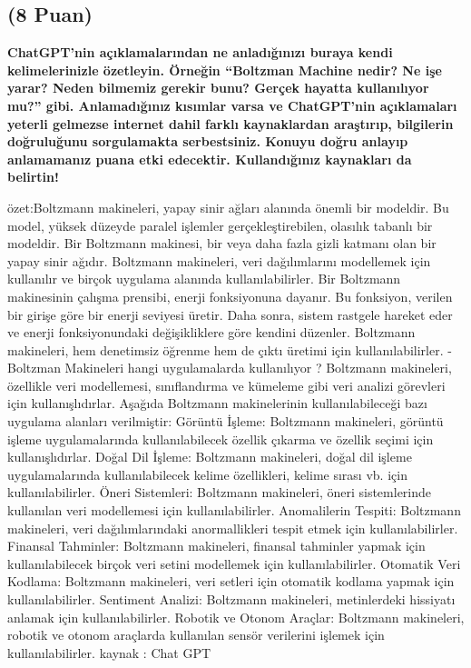 \documentclass[11pt]{article}
\begin{document}
\subsection{(8 Puan)} \textbf{ChatGPT’nin açıklamalarından ne anladığınızı buraya kendi kelimelerinizle özetleyin. Örneğin ``Boltzman Machine nedir? Ne işe yarar? Neden bilmemiz gerekir bunu? Gerçek hayatta kullanılıyor mu?'' gibi. Anlamadığınız kısımlar varsa ve ChatGPT’nin açıklamaları yeterli gelmezse internet dahil farklı kaynaklardan araştırıp, bilgilerin doğruluğunu sorgulamakta serbestsiniz. Konuyu doğru anlayıp anlamamanız puana etki edecektir. Kullandığınız kaynakları da belirtin!}

özet:Boltzmann makineleri, yapay sinir ağları alanında önemli bir modeldir.
Bu model, yüksek düzeyde paralel işlemler gerçekleştirebilen, olasılık tabanlı bir modeldir.
Bir Boltzmann makinesi, bir veya daha fazla gizli katmanı olan bir yapay sinir ağıdır.
Boltzmann makineleri, veri dağılımlarını modellemek için kullanılır ve birçok uygulama alanında kullanılabilirler.
Bir Boltzmann makinesinin çalışma prensibi, enerji fonksiyonuna dayanır.
Bu fonksiyon, verilen bir girişe göre bir enerji seviyesi üretir.
Daha sonra, sistem rastgele hareket eder ve enerji fonksiyonundaki değişikliklere göre kendini düzenler.
Boltzmann makineleri, hem denetimsiz öğrenme hem de çıktı üretimi için kullanılabilirler.
-Boltzman Makineleri hangi uygulamalarda kullanılıyor ?
Boltzmann makineleri, özellikle veri modellemesi, sınıflandırma ve kümeleme gibi veri analizi görevleri için kullanışlıdırlar. Aşağıda Boltzmann makinelerinin kullanılabileceği bazı uygulama alanları verilmiştir:
Görüntü İşleme: Boltzmann makineleri, görüntü işleme uygulamalarında kullanılabilecek özellik çıkarma ve özellik seçimi için kullanışlıdırlar.
Doğal Dil İşleme: Boltzmann makineleri, doğal dil işleme uygulamalarında kullanılabilecek kelime özellikleri, kelime sırası vb. için kullanılabilirler.
Öneri Sistemleri: Boltzmann makineleri, öneri sistemlerinde kullanılan veri modellemesi için kullanılabilirler.
Anomalilerin Tespiti: Boltzmann makineleri, veri dağılımlarındaki anormallikleri tespit etmek için kullanılabilirler.
Finansal Tahminler: Boltzmann makineleri, finansal tahminler yapmak için kullanılabilecek birçok veri setini modellemek için kullanılabilirler.
Otomatik Veri Kodlama: Boltzmann makineleri, veri setleri için otomatik kodlama yapmak için kullanılabilirler.
Sentiment Analizi: Boltzmann makineleri, metinlerdeki hissiyatı anlamak için kullanılabilirler.
Robotik ve Otonom Araçlar: Boltzmann makineleri, robotik ve otonom araçlarda kullanılan sensör verilerini işlemek için kullanılabilirler.
kaynak : Chat GPT
\end{document}
